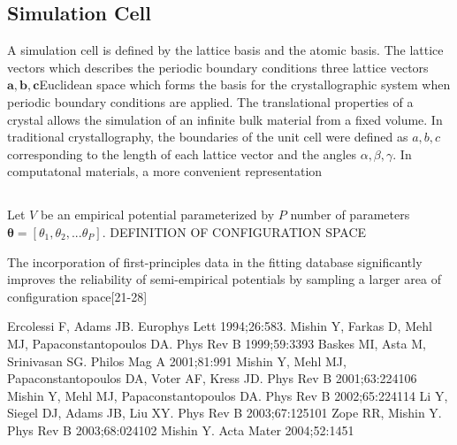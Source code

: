 \subsection{Simulation Cell}
A simulation cell is defined by the lattice basis and the atomic basis.  The lattice vectors which describes the periodic boundary conditions three lattice vectors $\bm{a},\bm{b},\bm{c}$Euclidean space which forms the basis for the crystallographic system when periodic boundary conditions are applied.  The translational properties of a crystal allows the simulation of an infinite bulk material from a fixed volume.  In traditional crystallography, the boundaries of the unit cell were defined as $a,b,c$ corresponding to the length of each lattice vector and the angles $\alpha,\beta,\gamma$.  In computatonal materials, a more convenient representation

\subsection{}
Let $V$ be an empirical potential parameterized by $P$ number of parameters $\bm{\theta}=[\theta_1,\theta_2,...\theta_P]$.
DEFINITION OF CONFIGURATION SPACE

The incorporation of first-principles data in the fitting database significantly improves the reliability of semi-empirical potentials by sampling a larger area of configuration space[21-28]

Ercolessi F, Adams JB. Europhys Lett 1994;26:583.
Mishin Y, Farkas D, Mehl MJ, Papaconstantopoulos DA. Phys Rev B 1999;59:3393
Baskes MI, Asta M, Srinivasan SG. Philos Mag A 2001;81:991
Mishin Y, Mehl MJ, Papaconstantopoulos DA, Voter AF, Kress JD. Phys Rev B 2001;63:224106
Mishin Y, Mehl MJ, Papaconstantopoulos DA. Phys Rev B 2002;65:224114
Li Y, Siegel DJ, Adams JB, Liu XY. Phys Rev B 2003;67:125101
Zope RR, Mishin Y. Phys Rev B 2003;68:024102
Mishin Y. Acta Mater 2004;52:1451
